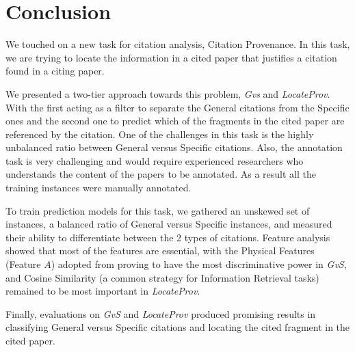 \chapter{Conclusion}
\label{conclusion}
We touched on a new task for citation analysis, Citation Provenance. In this task, we are trying to locate the information in a cited paper that justifies a citation found in a citing paper.

We presented a two-tier approach towards this problem, {\it Gvs} and {\it LocateProv}. With the first acting as a filter to separate the General citations from the Specific ones and the second one to predict which of the fragments in the cited paper are referenced by the citation. One of the challenges in this task is the highly unbalanced ratio between General versus Specific citations. Also, the annotation task is very challenging and would require experienced researchers who understands the content of the papers to be annotated. As a result all the training instances were manually annotated.

To train prediction models for this task, we gathered an unskewed set of instances, a balanced ratio of General versus Specific instances, and measured their ability to differentiate between the 2 types of citations. Feature analysis showed that most of the features are essential, with the Physical Features (Feature $A$) adopted from  proving to have the most discriminative power in {\it GvS}, and Cosine Similarity (a common strategy for Information Retrieval tasks) remained to be most important in {\it LocateProv}.

Finally, evaluations on {\it GvS} and {\it LocateProv} produced promising results in classifying General versus Specific citations and locating the cited fragment in the cited paper.